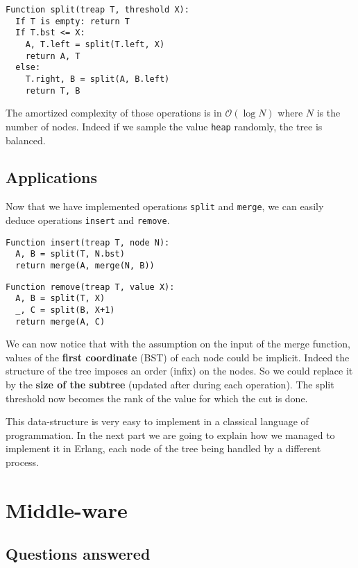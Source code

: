 \documentclass[a4paper, 11pt]{article}
\begin{document}
\begin{verbatim}
Function split(treap T, threshold X):
  If T is empty: return T
  If T.bst <= X:
    A, T.left = split(T.left, X)
    return A, T
  else:
    T.right, B = split(A, B.left)
    return T, B
\end{verbatim}

The amortized complexity of those operations is in $\mathcal O(\log N)$ where $N$ is the number of nodes. Indeed if we sample the value \verb|heap| randomly, the tree is balanced.

\newpage
\subsection{Applications}

Now that we have implemented operations \verb|split| and \verb|merge|, we can easily deduce operations \verb|insert| and \verb|remove|.

\begin{verbatim}
Function insert(treap T, node N):
  A, B = split(T, N.bst)
  return merge(A, merge(N, B))
\end{verbatim} 

\begin{verbatim}
Function remove(treap T, value X):
  A, B = split(T, X)
  _, C = split(B, X+1)
  return merge(A, C)
\end{verbatim} 

We can now notice that with the assumption on the input of the merge function, values of the \textbf{first coordinate} (BST) of each node could be implicit. Indeed the structure of the tree imposes an order (infix) on the nodes. So we could replace it by the \textbf{size of the subtree} (updated after during each operation). The split threshold now becomes the rank of the value for which the cut is done.

\medskip This data-structure is very easy to implement in a classical language of programmation. In the next part we are going to explain how we managed to implement it in Erlang, each node of the tree being handled by a different process.

\newpage

\section{Middle-ware}

\subsection{Questions answered}
\end{document}
